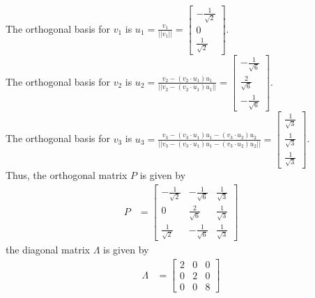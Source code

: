 The orthogonal basis for $v_1$ is $u_1 = \frac{v_1}{||v_1||} = \begin{bmatrix} -\frac{1}{\sqrt{2}} \\ 0 \\ \frac{1}{\sqrt{2}} \end{bmatrix}$.\\
The orthogonal basis for $v_2$ is $u_2 = \frac{v_2 - (v_2 \cdot u_1)u_1}{||v_2 - (v_2 \cdot u_1)u_1||} = \begin{bmatrix} -\frac{1}{\sqrt{6}} \\ \frac{2}{\sqrt{6}} \\ -\frac{1}{\sqrt{6}} \end{bmatrix}$.\\
The orthogonal basis for $v_3$ is $u_3 = \frac{v_3 - (v_3 \cdot u_1)u_1 - (v_3 \cdot u_2)u_2}{||v_3 - (v_3 \cdot u_1)u_1 - (v_3 \cdot u_2)u_2||} = \begin{bmatrix} \frac{1}{\sqrt{3}} \\ \frac{1}{\sqrt{3}} \\ \frac{1}{\sqrt{3}} \end{bmatrix}$.\\
Thus, the orthogonal matrix $P$ is given by
\begin{align*}
    P &= \begin{bmatrix} -\frac{1}{\sqrt{2}} & -\frac{1}{\sqrt{6}} & \frac{1}{\sqrt{3}} \\ 0 & \frac{2}{\sqrt{6}} & \frac{1}{\sqrt{3}} \\ \frac{1}{\sqrt{2}} & -\frac{1}{\sqrt{6}} & \frac{1}{\sqrt{3}} \end{bmatrix}
\end{align*}
the diagonal matrix $\Lambda$ is given by
\begin{align*}
    \Lambda &= \begin{bmatrix} 2 & 0 & 0 \\ 0 & 2 & 0 \\ 0 & 0 & 8 \end{bmatrix}
\end{align*}

\newpage